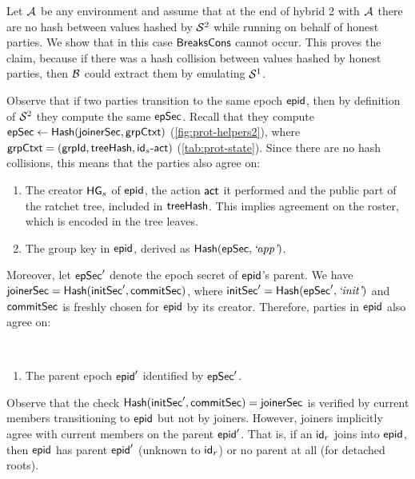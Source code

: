 Let $\mathcal{A}_{\relax}$ be any environment and assume that at the end of hybrid 2 with $\mathcal{A}_{\relax}$ there are no hash between values hashed by $\mathcal{S}_{\textsc{\relax}}^2$ while running \saik on behalf of honest parties. We show that in this case $\textnormal{\textsf{BreaksCons}}$ cannot occur. This proves the claim, because if there was a hash collision between values hashed by honest parties, then $\mathcal{B}_{\relax}$ could extract them by emulating $\mathcal{S}_{\textsc{\relax}}^1$.

Observe that if two parties transition to the same epoch ${\normalfont\textsf{epid}}$, then by definition of $\mathcal{S}_{\textsc{\relax}}^2$ they compute the same ${\mathsf{epSec}}$. Recall that they compute ${\mathsf{epSec}} \gets {\ensuremath{\mathsf{Hash}}}({\mathsf{joinerSec}}, {\mathsf{grpCtxt}})$ (\cref{fig:prot-helpers2}), where ${\mathsf{grpCtxt}}=({\mathsf{grpId}}, {\mathsf{treeHash}}, {\mathsf{id}}_s\textrm{-}\mathsf{act})$ (\cref{tab:prot-state}).
Since there are no hash collisions, this means that the parties also agree on:
\begin{enumerate}[label=\alph*)]
  \item The creator ${\mathsf{HG}}_s$ of ${\normalfont\textsf{epid}}$, the action $\mathsf{act}$ it performed and the public part of the ratchet tree, included in ${\mathsf{treeHash}}$. This implies agreement on the roster, which is encoded in the tree leaves.
  \item The group key in ${\normalfont\textsf{epid}}$, derived as ${\mathsf{Hash}}({\mathsf{epSec}}, {\text{\normalfont \it`app'}})$.
\end{enumerate}

Moreover, let ${\mathsf{epSec}}'$ denote the epoch secret of ${\normalfont\textsf{epid}}$'s parent. We have ${\mathsf{joinerSec}} = {\mathsf{Hash}}({\mathsf{initSec}}', {\mathsf{commitSec}})$, where ${\mathsf{initSec}}' = {\mathsf{Hash}}({\mathsf{epSec}}', {\text{\normalfont \it`init'}})$ and ${\mathsf{commitSec}}$ is freshly chosen for ${\normalfont\textsf{epid}}$ by its creator. Therefore, parties in ${\normalfont\textsf{epid}}$ also agree on:\\
\begin{minipage}{\linewidth}~
\begin{enumerate}[label=\alph*),start=3]
  \item The parent epoch ${\normalfont\textsf{epid}}'$ identified by ${\mathsf{epSec}}'$.
\end{enumerate}
\end{minipage}

\medskip\noindent Observe that the check ${\mathsf{Hash}}({\mathsf{initSec}}', {\mathsf{commitSec}})={\mathsf{joinerSec}}$ is verified by current members transitioning to ${\normalfont\textsf{epid}}$ but not by joiners. However, joiners implicitly agree with current members on the parent ${\normalfont\textsf{epid}}'$. That is, if an ${\mathsf{id}}_r$ joins into ${\normalfont\textsf{epid}}$, then ${\normalfont\textsf{epid}}$ has parent ${\normalfont\textsf{epid}}'$ (unknown to ${\mathsf{id}}_r$) or no parent at all (for detached roots).

